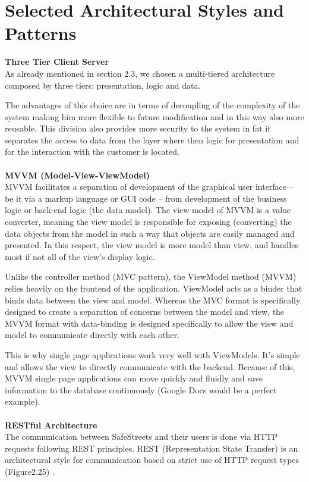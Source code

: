 \documentclass[../RASD.tex]{subfiles}
\begin{document}
    \section{Selected Architectural Styles and Patterns}\label{sec:selected-architectural-styles-and-patterns}
    \textbf{Three Tier Client Server} \\
    As already mentioned in section 2.3, we chosen a multi-tiered architecture composed by three tiers: presentation, logic and data.

    The advantages of this choice are in terms of decoupling of the complexity of the system making him more flexible to future modification and in this way also more reusable. This division also provides more security to the system in fat it separates the access to data from the layer where then logic for presentation and for the interaction with the customer is located.
    \\
    \\
    \textbf{MVVM (Model-View-ViewModel)} \\
    MVVM facilitates a separation of development of the graphical user interface – be it via a markup language or GUI code – from development of the business logic or back-end logic (the data model). The view model of MVVM is a value converter, meaning the view model is responsible for exposing (converting) the data objects from the model in such a way that objects are easily managed and presented. In this respect, the view model is more model than view, and handles most if not all of the view's display logic.

    Unlike the controller method (MVC pattern), the ViewModel method (MVVM) relies heavily on the frontend of the application. ViewModel acts as a binder that binds data between the view and model. Whereas the MVC format is specifically designed to create a separation of concerns between the model and view, the MVVM format with data-binding is designed specifically to allow the view and model to communicate directly with each other.

    This is why single page applications work very well with ViewModels. It’s simple and allows the view to directly communicate with the backend. Because of this, MVVM single page applications can move quickly and fluidly and save information to the database continuously (Google Docs would be a perfect example).
    \\
    \\
    \textbf{RESTful Architecture} \\
    The communication between SafeStreets and their users is done via HTTP requests following REST principles. REST (Representation State Transfer) is an architectural style for communication based on strict use of HTTP request types (Figure2.25) .
\end{document}
